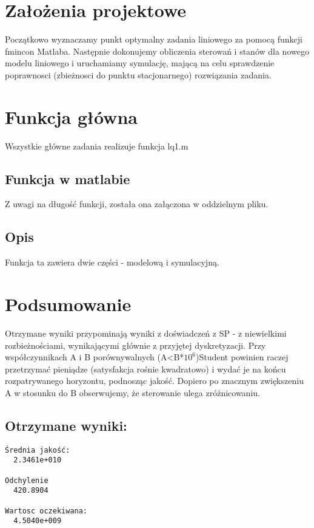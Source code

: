 \documentclass[11pt,a4paper]{article}
\begin{document}
\section{Założenia projektowe}
Początkowo wyznaczamy punkt optymalny zadania liniowego za pomocą funkcji fmincon Matlaba. Następnie dokonujemy obliczenia sterowań i stanów dla nowego modelu liniowego i uruchamiamy symulację, mającą na celu sprawdzenie poprawnosci (zbieżnosci do punktu stacjonarnego) rozwiązania zadania.

\section{Funkcja główna}
Wszystkie główne zadania realizuje funkcja lq1.m
\subsection{Funkcja w matlabie}
Z uwagi na długość funkcji, została ona załączona w oddzielnym pliku.

\subsection{Opis}
Funkcja ta zawiera dwie części - modelową i symulacyjną.\\



\section{Podsumowanie}
Otrzymane wyniki przypominają wyniki z doświadczeń z SP - z niewielkimi rozbieżnościami, wynikającymi głównie z przyjętej dyskretyzacji.
Przy współczynnikach A i B porównywalnych (A<B*$10^6$)Student powinien raczej przetrzymać pieniądze (satysfakcja rośnie kwadratowo) i wydać je na końcu rozpatrywanego horyzontu, podnosząc jakość. Dopiero po znacznym zwiększeniu A w stosunku do B obserwujemy, że sterowanie ulega zróżnicowaniu.
\subsection{Otrzymane wyniki:}
\begin{verbatim}
Średnia jakość:
  2.3461e+010

Odchylenie
  420.8904

Wartosc oczekiwana:
  4.5040e+009
\end{verbatim}
\end{document}
